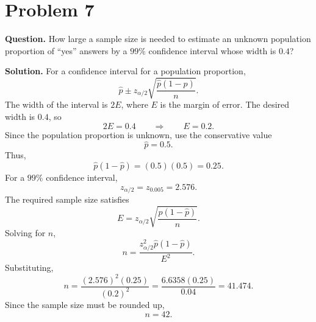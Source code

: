 \documentclass[11pt]{article}
\begin{document}
\section*{Problem 7}

\textbf{Question.} How large a sample size is needed to estimate an unknown population proportion of ``yes'' answers by a $99\%$ confidence interval whose width is $0.4$?

\textbf{Solution.} For a confidence interval for a population proportion,
\[
\hat p\pm z_{\alpha/2}\sqrt{\frac{\hat p(1-\hat p)}{n}}.
\]
The width of the interval is $2E$, where $E$ is the margin of error. The desired width is $0.4$, so
\[
2E=0.4 \qquad \Longrightarrow \qquad E=0.2.
\]
Since the population proportion is unknown, use the conservative value
\[
\hat p=0.5.
\]
Thus,
\[
\hat p(1-\hat p)=(0.5)(0.5)=0.25.
\]
For a $99\%$ confidence interval,
\[
z_{\alpha/2}=z_{0.005}=2.576.
\]
The required sample size satisfies
\[
E=z_{\alpha/2}\sqrt{\frac{\hat p(1-\hat p)}{n}}.
\]
Solving for $n$,
\[
n=\frac{z_{\alpha/2}^2\hat p(1-\hat p)}{E^2}.
\]
Substituting,
\[
n=\frac{(2.576)^2(0.25)}{(0.2)^2}=\frac{6.6358(0.25)}{0.04}=41.474.
\]
Since the sample size must be rounded up,
\[
\boxed{n=42}.
\]

\newpage
\end{document}
